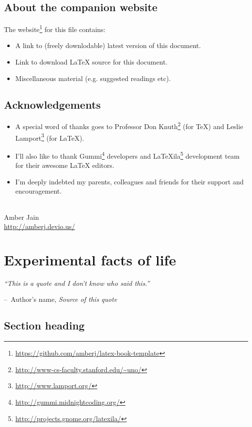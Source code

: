 \documentclass[a4paper,11pt]{book}
\makeatletter
\newenvironment{chapquote}[2][2em]
  {\setlength{\@tempdima}{#1}%
   \def\chapquote@author{#2}%
   \parshape 1 \@tempdima \dimexpr\textwidth-2\@tempdima\relax%
   \itshape}
  {\par\normalfont\hfill--\ \chapquote@author\hspace*{\@tempdima}\par\bigskip}
\makeatother
\begin{document}
\section*{About the companion website}
The website\footnote{\url{https://github.com/amberj/latex-book-template}} for this file contains:
\begin{itemize}
  \item A link to (freely downlodable) latest version of this document.
  \item Link to download LaTeX source for this document.
  \item Miscellaneous material (e.g. suggested readings etc).
\end{itemize}

\section*{Acknowledgements}
\begin{itemize}
\item A special word of thanks goes to Professor Don Knuth\footnote{\url{http://www-cs-faculty.stanford.edu/~uno/}} (for \TeX{}) and Leslie Lamport\footnote{\url{http://www.lamport.org/}} (for \LaTeX{}).
\item I'll also like to thank Gummi\footnote{\url{http://gummi.midnightcoding.org/}} developers and LaTeXila\footnote{\url{http://projects.gnome.org/latexila/}} development team for their awesome \LaTeX{} editors.
\item I'm deeply indebted my parents, colleagues and friends for their support and encouragement.
\end{itemize}
\mbox{}\\
\noindent Amber Jain \\
\noindent \url{http://amberj.devio.us/}

\chapter{Experimental facts of life}

\begin{chapquote}{Author's name, \textit{Source of this quote}}
``This is a quote and I don't know who said this.''
\end{chapquote}

\section{Section heading}
\end{document}
